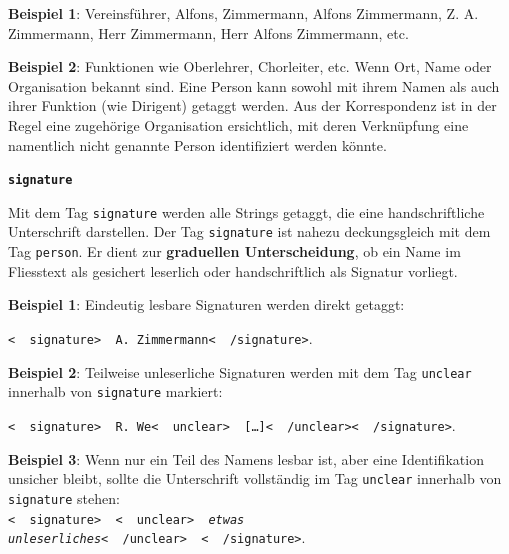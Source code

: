 \documentclass[12pt, a4paper, ngerman, bidi=default]{article}
\begin{document}
\begin{description}
\begin{description}
    \noindent \textbf{ Beispiel 1}: Vereinsführer, Alfons, Zimmermann, Alfons Zimmermann, Z. A. Zimmermann, Herr Zimmermann, Herr Alfons Zimmermann, etc. 

    \textbf{ Beispiel 2}: Funktionen wie Oberlehrer, Chorleiter, etc.
    Wenn Ort, Name oder Organisation bekannt sind. Eine Person kann sowohl mit ihrem Namen als auch ihrer Funktion (wie Dirigent) getaggt werden.  
    Aus der Korrespondenz ist in der Regel eine zugehörige Organisation ersichtlich, mit deren Verknüpfung eine namentlich nicht genannte Person identifiziert werden könnte.

    
    \item\texttt{\textbf{{\colorbox{signature}{signature}}}}
        
    Mit dem Tag \texttt{\colorbox{signature}{signature}} werden alle Strings getaggt, die eine handschriftliche Unterschrift darstellen.  
    Der Tag \texttt{\colorbox{signature}{signature}} ist nahezu deckungsgleich mit dem Tag \texttt{\colorbox{person}{person}}.  
    Er dient zur \textbf{graduellen Unterscheidung}, ob ein Name im Fliesstext als gesichert leserlich oder handschriftlich als Signatur vorliegt.  
    
    \noindent \textbf{ Beispiel 1}: Eindeutig lesbare Signaturen werden direkt getaggt:  

    \colorbox{VeryLightGray}{\texttt{\textless\ \  signature\textgreater\ \  A. Zimmermann\textless\ \  /signature\textgreater}}. 

    \textbf{ Beispiel 2}: Teilweise unleserliche Signaturen werden mit dem Tag \texttt{\colorbox{unclear}{unclear}} innerhalb von \texttt{\colorbox{signature}{signature}} markiert: 

    \colorbox{VeryLightGray}{\texttt{\textless\ \  signature\textgreater\ \  R. We\textless\ \  unclear\textgreater\ \  [\ldots]\textless\ \  /unclear\textgreater\textless\ \  /signature\textgreater}}. 

    
    \textbf{ Beispiel 3}: Wenn nur ein Teil des Namens lesbar ist, aber eine Identifikation unsicher bleibt, sollte die Unterschrift 
    vollständig im Tag \texttt{\colorbox{unclear}{unclear}} innerhalb von \texttt{\colorbox{signature}{signature}} stehen:\\

    \colorbox{VeryLightGray}
    {\texttt{\textless\ \  signature\textgreater\ \  \textless\ \  unclear\textgreater\ \  \textit{etwas unleserliches}\textless\ \  /unclear\textgreater\ \  \textless\ \  /signature\textgreater}.} 
    

\end{description}
\end{description}
\end{document}
